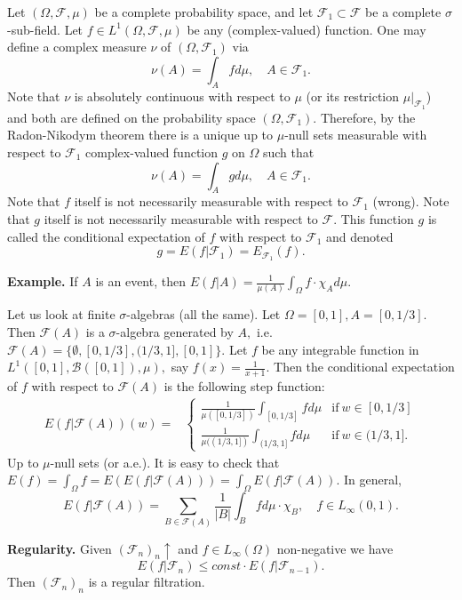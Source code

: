 \documentclass[reqno]{amsart}
\numberwithin{equation}{section}
\begin{document}
Let $(\Omega, \mathcal{F}, \mu)$ be a complete probability space, and let $\mathcal{F}_1 \subset \mathcal{F}$ be a complete $\sigma$-sub-field. Let $f\in L^1(\Omega, \mathcal{F}, \mu)$ be any (complex-valued) function.
One may define a complex measure $\nu$ of $(\Omega, \mathcal{F}_1)$ via
$$\nu(A)=\int_A fd\mu, \quad A\in \mathcal{F}_1.$$
Note that $\nu$ is absolutely continuous with respect to $\mu$ (or its restriction $\mu|_{\mathcal{F}_1}$) and both are defined on the probability space $(\Omega, \mathcal{F}_1).$ Therefore, by the Radon-Nikodym theorem there is a unique up to $\mu$-null sets measurable with respect to $\mathcal{F}_1$ complex-valued function $g$ on $\Omega$ such that
$$\nu(A)=\int_A gd\mu, \quad A\in \mathcal{F}_1.$$
 Note that $f$ itself is not necessarily measurable with respect to $\mathcal{F}_1$ (wrong).   Note that $g$ itself is not necessarily measurable with respect to $\mathcal{F}.$ 
 This function $g$ is called the conditional expectation of $f$ with respect to $\mathcal{F}_1$ and denoted 
 $$g=E(f|\mathcal{F}_1)=E_{\mathcal{F}_1}(f).$$


{\bf Example.} If $A$ is an event, then $E(f|A)=\frac{1}{\mu(A)}\int_\Omega f\cdot \chi_A d\mu.$

Let us look at finite $\sigma$-algebras (all the same). Let $\Omega=[0,1], A=[0, 1/3].$ Then $\mathcal{F}(A)$ is a $\sigma$-algebra generated by $A,$ i.e. $\mathcal{F}(A)=\{\emptyset, [0,1/3], (1/3,1], [0,1]\}.$ Let $f$ be any integrable function in $L^1([0,1], \mathcal{B}([0,1]), \mu),$ say $f(x)=\frac{1}{x+1}.$ Then the conditional expectation of $f$ with respect to $\mathcal{F}(A)$ is the following step function:
$$
\begin{aligned}
E(f|\mathcal{F}(A))(w)= & 
\begin{cases}
    \frac{1}{\mu([0,1/3])} \int_{[0,1/3]} fd\mu & \text{if} \ w\in [0,1/3] \\
    \frac{1}{\mu((1/3,1])} \int_{(1/3,1]} fd\mu & \text{if} \ w\in (1/3,1].
\end{cases}
\end{aligned}
$$
Up to $\mu$-null sets (or a.e.). It is easy to check that $E(f)=\int_\Omega f=E(E(f|\mathcal{F}(A)))=\int_\Omega E(f|\mathcal{F}(A)).$ In general,
$$E(f|\mathcal{F}(A))=\sum_{B\in \mathcal{F}(A)} \frac{1}{|B|} \int_B fd\mu \cdot \chi_B, \quad f\in L_\infty(0,1).$$

{\bf Regularity.} Given $(\mathcal{F}_n)_n \uparrow$ and $f\in L_\infty(\Omega)$ non-negative we have
$$E(f|\mathcal{F}_n) \le const \cdot E(f|\mathcal{F}_{n-1}).$$
Then $(\mathcal{F}_n)_n $ is a regular filtration.
\end{document}
